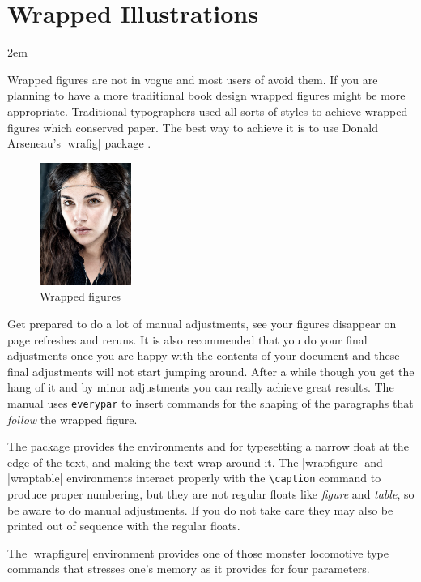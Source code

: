 \restoregeometry

\chapter{Wrapped Illustrations}
\label{ch:wrapped}
\parindent2em
\let\onepar\lorem

Wrapped figures are not in vogue and most users of \latex avoid them.
If you are planning to have a more traditional book design wrapped figures might be more appropriate. Traditional typographers used
all sorts of styles to achieve wrapped figures which conserved paper. 
The best way to achieve it is to use Donald Arseneau's |wrafig| package \citep{wrapfig}.

\begin{figure}
    \includegraphics[width=3cm]{./images/amato.jpg}
    \caption{\footnotesize Wrapped figures}
\end{figure}

Get prepared to do a lot of manual adjustments, see your figures disappear on page refreshes and reruns. It is also recommended that you do your final adjustments once you are happy with the contents of your document and these final adjustments will not start jumping around. 
After a while though you get the hang of it and by minor adjustments you can really achieve great results. The manual uses \verb+everypar+ to insert commands for the shaping of the paragraphs that \emph{follow} the wrapped figure.

The package provides the environments  and  for typesetting a
narrow float at the edge of the text, and making the text wrap around it. The |wrapfigure|
and |wraptable| environments interact properly with the \verb+\caption+ command to produce
proper numbering, but they are not regular floats like \textit{figure} and \textit{table}, so be aware to do manual adjustments. If you do not take care 
they may also be printed out of sequence with the regular floats.

The |wrapfigure| environment  provides one of those monster locomotive type commands that stresses one's memory as it provides for four parameters.
 
